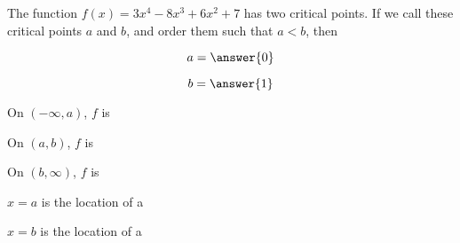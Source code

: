 \documentclass[handout]{ximera}
\begin{document}
\begin{exercise}
The function $f(x) = 3x^4-8x^3+6x^2+7$ has two critical points.  If we
call these critical points $a$ and $b$, and order them such that $a <
b $, then

$$
a = \answer{0}
$$

$$
b=\answer{1}
$$



On $(-\infty,a)$, $f$ is 

On $(a,b)$, $f$ is 

On $(b,\infty)$, $f$ is 


$x=a$ is the location of a 

$x=b$ is the location of a 


\end{exercise}
\end{document}
